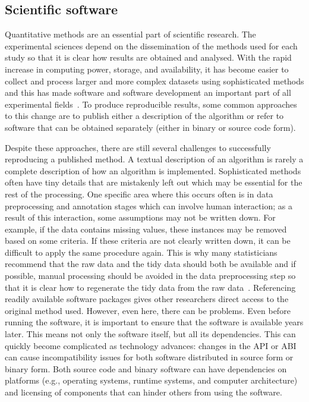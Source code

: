 \subsection{Scientific software}\label{subsec:sci-soft}
{ %
	Quantitative methods are an essential part of scientific research. The
	experimental sciences depend on the dissemination of the methods used for each
	study so that it is clear how results are obtained and analysed.
	With the rapid increase in computing power, storage, and availability,
	it has become easier to collect and process larger and more complex datasets
	using sophisticated methods and this has made software and
	software development an important part of all experimental
	fields~\autocite{Baxter2006,SSI:hettrick_2014_14809}.
	To produce reproducible results, some common approaches to this change are
	to publish either a description of the algorithm or refer to software
	that can be obtained separately (either in binary or source code form).
}

Despite these approaches, there are still several challenges to successfully
reproducing a published method.
{ %
	A textual description of an algorithm is rarely a complete description of
	how an algorithm is implemented. Sophisticated methods often have tiny details
	that are mistakenly left out which may be essential for the rest of the
	processing. One specific area where this occurs often is
	in data preprocessing and annotation stages which can
	involve human interaction; as a result of this
	interaction, some assumptions
	may not be written down. For example, if the data contains
	missing values, these instances may be removed based on
	some criteria. If these criteria are not clearly written
	down, it can be difficult to apply the same procedure
	again. This is why many statisticians recommend that the
	raw data and the tidy data should both be available and if
	possible, manual processing should be avoided in the data
	preprocessing step so that it is clear how to regenerate the
	tidy data from the raw data~\autocite{Sandve2013,datasharing:Leek,Jaffe2015,Wickham:tidy-data}.
}
{ %
	Referencing readily available software packages gives
	other researchers direct access to the original method
	used. However, even here, there can be problems.
	Even before running the software, it is important to
	ensure that the
	software is available years later. This means not only the software itself, but
	all its dependencies. This can quickly become complicated as technology
	advances: changes in the \acrfull{API} or \acrfull{ABI}
	can cause incompatibility issues for both software
	distributed in source form or binary form. Both source
	code and binary software can have dependencies on
	platforms (e.g., operating systems, runtime systems, and computer
	architecture) and licensing of components that can
	hinder others from using the software.
}

